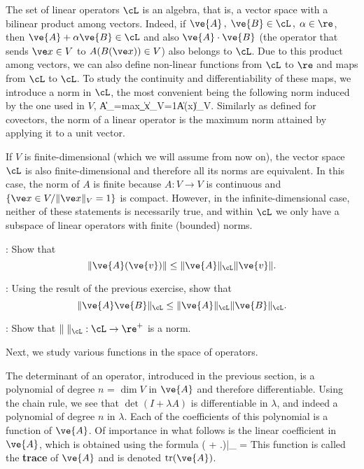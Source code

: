 The set of linear operators
$\cL$ is an algebra, that is, a vector space with a bilinear product among vectors.
Indeed, if $\ve{A}\,,\;\ve{B}\in \cL\,,\;\alpha\in \re$, 
then $\ve{A}+\alpha\ve{B}\in\cL$ and also 
$\ve{A}\cdot\ve{B}$ (the operator that sends $\ve x\in V$ 
to $A(B(\ve x)) \in V$) also belongs to $\cL$.
Due to this product among vectors, we can also define non-linear functions from $\cL$ to $\re$ and maps from $\cL$ to $\cL$. To study the continuity and differentiability of these maps, we introduce a norm in $\cL$, the most convenient being the following norm induced by the one used in $V$,
\beq
\|A\|_{\cL}=\mbox{max}_{\|\ve x\|_V=1}\|A(\ve x)\|_V.
\eeq
Similarly as defined for covectors, the norm of a linear operator is the maximum norm attained by applying it to a unit vector.

If $V$ is finite-dimensional (which we will assume from now on), 
the vector space $\cL$ is also finite-dimensional and therefore all its norms are equivalent. In this case, the norm of $A$ is finite because 
$A:V\to V$ is continuous and $\{\ve x\in V/\|\ve x\|_V=1\}$ is compact. However, in the infinite-dimensional case, neither of these statements is necessarily true, and within $\cL$ we only have a subspace of linear operators with finite (bounded) norms.
\espa

\ejer: Show that 
\[
\|\ve{A}(\ve{v})\| \leq \|\ve{A}\|_{\cL} \|\ve{v}\|.
\]
\espa

\ejer: Using the result of the previous exercise, show that 
\[
\|\ve{A}\ve{B}\|_{\cL} \leq \|\ve{A}\|_{\cL}\|\ve{B}\|_{\cL}.
\]
\espa

\ejer:
Show that $\|\;\|_{\cL}:\cL\to \re^+$ is a norm.
\espa

Next, we study various functions in the space of operators.
\espa

The determinant of an operator, introduced in the previous section, is a polynomial of degree $n$ = $\dim V$ in $\ve{A}$ and therefore differentiable. Using the chain rule, we see that
$\det (I+\lambda A)$ is differentiable in $\lambda$, and indeed a polynomial
of degree $n$ in $\lambda$. Each of the coefficients of this
polynomial is a function of $\ve{A}$. Of importance in what
follows is the linear coefficient in $\ve{A}$, which is obtained using the
formula
\beq
\der{\lambda} \det( + \left.\lambda {})\right|_{} =
\dip{}
\label{eqn:2_traza}
\eeq
\noi This function is called the {\bf trace}  of 
$\ve{A}$ and is denoted $\text{tr} (\ve{A})$. 

